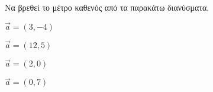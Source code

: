Να βρεθεί το μέτρο καθενός από τα παρακάτω διανύσματα.
\begin{multicols}{2}
\begin{alist}
\item $ \vec{a}=(3,-4) $
\item $ \vec{a}=(12,5) $
\item $ \vec{a}=(2,0) $
\item $ \vec{a}=(0,7) $
\end{alist}
\end{multicols}
